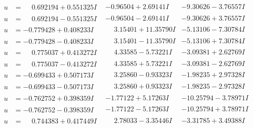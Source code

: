 \documentclass[1p]{elsarticle_modified}
\theoremstyle{definition}
\begin{document}
$$\begin{array}{c|c|c}
 \hline 
\begin{aligned}
u &= \phantom{-}0.692194 + 0.551325 I\end{aligned}
 & -0.96504 + 2.69141 I & -9.30626 - 3.76557 I \\ \hline\begin{aligned}
u &= \phantom{-}0.692194 - 0.551325 I\end{aligned}
 & -0.96504 - 2.69141 I & -9.30626 + 3.76557 I \\ \hline\begin{aligned}
u &= -0.779428 + 0.408233 I\end{aligned}
 & \phantom{-}3.15401 + 11.35790 I & -5.13106 - 7.30784 I \\ \hline\begin{aligned}
u &= -0.779428 - 0.408233 I\end{aligned}
 & \phantom{-}3.15401 - 11.35790 I & -5.13106 + 7.30784 I \\ \hline\begin{aligned}
u &= \phantom{-}0.775037 + 0.413272 I\end{aligned}
 & \phantom{-}4.33585 - 5.73221 I & -3.09381 + 2.62769 I \\ \hline\begin{aligned}
u &= \phantom{-}0.775037 - 0.413272 I\end{aligned}
 & \phantom{-}4.33585 + 5.73221 I & -3.09381 - 2.62769 I \\ \hline\begin{aligned}
u &= -0.699433 + 0.507173 I\end{aligned}
 & \phantom{-}3.25860 - 0.93323 I & -1.98235 + 2.97328 I \\ \hline\begin{aligned}
u &= -0.699433 - 0.507173 I\end{aligned}
 & \phantom{-}3.25860 + 0.93323 I & -1.98235 - 2.97328 I \\ \hline\begin{aligned}
u &= -0.762752 + 0.398359 I\end{aligned}
 & -1.77122 + 5.17263 I & -10.25794 - 3.78971 I \\ \hline\begin{aligned}
u &= -0.762752 - 0.398359 I\end{aligned}
 & -1.77122 - 5.17263 I & -10.25794 + 3.78971 I \\ \hline\begin{aligned}
u &= \phantom{-}0.744383 + 0.417449 I\end{aligned}
 & \phantom{-}2.78033 - 3.35446 I & -3.31785 + 3.49388 I \\ \hline\begin{aligned}

\end{aligned}
\end{array}$$
\end{document}
